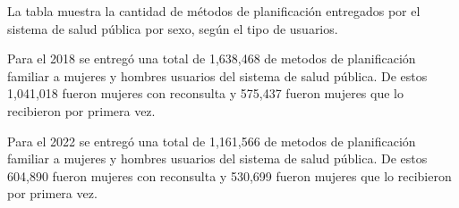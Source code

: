 La tabla muestra la cantidad de métodos de planificación entregados por el sistema de salud pública por sexo, según el tipo de usuarios. 

Para el 2018 se entregó una total de 1,638,468 de metodos de planificación familiar a mujeres y hombres usuarios del sistema de salud pública. De estos 1,041,018 fueron mujeres con reconsulta y 575,437 fueron mujeres que lo recibieron por primera vez. 

Para el 2022 se entregó una total de 1,161,566 de metodos de planificación familiar a mujeres y hombres usuarios del sistema de salud pública. De estos 604,890 fueron mujeres con reconsulta y 530,699 fueron mujeres que lo recibieron por primera vez. 
